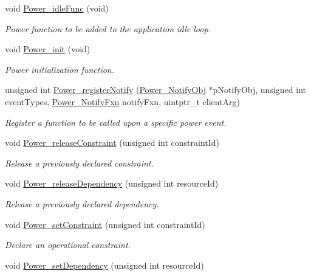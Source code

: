 \begin{DoxyCompactItemize}
void \hyperlink{_power_8h_a873219012923300f3b3b958b951a4ea1}{Power\+\_\+idle\+Func} (void)
\begin{DoxyCompactList}\small\item\em Power function to be added to the application idle loop. \end{DoxyCompactList}\item 
void \hyperlink{_power_8h_ac778e1f0fbf930a8dabd35fe0a49cb8d}{Power\+\_\+init} (void)
\begin{DoxyCompactList}\small\item\em Power initialization function. \end{DoxyCompactList}\item 
unsigned int \hyperlink{_power_8h_a8e73c431e3d1aab1a31181513ceb8adb}{Power\+\_\+register\+Notify} (\hyperlink{struct_power___notify_obj}{Power\+\_\+\+Notify\+Obj} $\ast$p\+Notify\+Obj, unsigned int event\+Types, \hyperlink{_power_8h_a91335240b2081eeefec80d043030c857}{Power\+\_\+\+Notify\+Fxn} notify\+Fxn, uintptr\+\_\+t client\+Arg)
\begin{DoxyCompactList}\small\item\em Register a function to be called upon a specific power event. \end{DoxyCompactList}\item 
void \hyperlink{_power_8h_a51ac80ce389379e25ad94347d567ea1f}{Power\+\_\+release\+Constraint} (unsigned int constraint\+Id)
\begin{DoxyCompactList}\small\item\em Release a previously declared constraint. \end{DoxyCompactList}\item 
void \hyperlink{_power_8h_a5ff8c1b6df212c2ff41c5e38b4d4a9cd}{Power\+\_\+release\+Dependency} (unsigned int resource\+Id)
\begin{DoxyCompactList}\small\item\em Release a previously declared dependency. \end{DoxyCompactList}\item 
void \hyperlink{_power_8h_a8533319df1b463beddc5b910241fde7d}{Power\+\_\+set\+Constraint} (unsigned int constraint\+Id)
\begin{DoxyCompactList}\small\item\em Declare an operational constraint. \end{DoxyCompactList}\item 
void \hyperlink{_power_8h_a2f2f4dfed7da8eed50a5b82e2bad26b5}{Power\+\_\+set\+Dependency} (unsigned int resource\+Id)

\end{DoxyCompactItemize}
